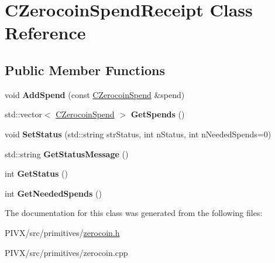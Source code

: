 \hypertarget{class_c_zerocoin_spend_receipt}{}\section{C\+Zerocoin\+Spend\+Receipt Class Reference}
\label{class_c_zerocoin_spend_receipt}
\subsection*{Public Member Functions}
\begin{DoxyCompactItemize}
\item 
\mbox{\label{class_c_zerocoin_spend_receipt_a1f90eb105cda7710a73155152a47bc3f}} 
void {\bfseries Add\+Spend} (const \mbox{\hyperlink{class_c_zerocoin_spend}{C\+Zerocoin\+Spend}} \&spend)
\item 
\mbox{\label{class_c_zerocoin_spend_receipt_a4baa56bcb6fb34fa67e1bad32036ca91}} 
std\+::vector$<$ \mbox{\hyperlink{class_c_zerocoin_spend}{C\+Zerocoin\+Spend}} $>$ {\bfseries Get\+Spends} ()
\item 
\mbox{\label{class_c_zerocoin_spend_receipt_af1ab82e92b9dea235c7ccbad660be7ba}} 
void {\bfseries Set\+Status} (std\+::string str\+Status, int n\+Status, int n\+Needed\+Spends=0)
\item 
\mbox{\label{class_c_zerocoin_spend_receipt_a165f5aa949e97e47ab7007a1d2c4b1bb}} 
std\+::string {\bfseries Get\+Status\+Message} ()
\item 
\mbox{\label{class_c_zerocoin_spend_receipt_a12432383fc7558ad8192c607cab4c715}} 
int {\bfseries Get\+Status} ()
\item 
\mbox{\label{class_c_zerocoin_spend_receipt_acf2523b9f1e65f04a9554a8bab1df554}} 
int {\bfseries Get\+Needed\+Spends} ()
\end{DoxyCompactItemize}


The documentation for this class was generated from the following files\+:\begin{DoxyCompactItemize}
\item 
P\+I\+V\+X/src/primitives/\mbox{\hyperlink{zerocoin_8h}{zerocoin.\+h}}\item 
P\+I\+V\+X/src/primitives/zerocoin.\+cpp\end{DoxyCompactItemize}
